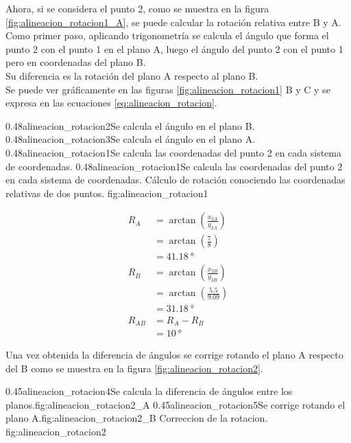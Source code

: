          Ahora, si se considera el punto 2, como se muestra en la figura \ref{fig:alineacion_rotacion1_A}, se puede calcular la rotación relativa entre B y A.\\
         Como primer paso, aplicando trigonometría se calcula el ángulo que forma el punto 2 con el punto 1 en el plano A, luego el ángulo del punto 2 con el punto 1 pero en coordenadas del plano B.\\
         Su diferencia es la rotación del plano A respecto al plano B.\\
         Se puede ver gráficamente en las figuras \ref{fig:alineacion_rotacion1} B y C y se expresa en las ecuaciones \ref{eq:alineacion_rotacion}.

\subfigtwotwo
            {0.48}{alineacion_rotacion2}{Se calcula el ángulo en el plano B.}
            {0.48}{alineacion_rotacion3}{Se calcula el ángulo en el plano A.}
            {0.48}{alineacion_rotacion1}{Se calcula las coordenadas del punto 2 en cada sistema de coordenadas.}
            {0.48}{alineacion_rotacion1}{Se calcula las coordenadas del punto 2 en cada sistema de coordenadas.}
            {Cálculo de rotación conociendo las coordenadas relativas de dos puntos.}
            {fig:alineacion_rotacion1}


         \begin{equation}
            \begin{aligned}
               R_A &= \arctan(\frac{x_{2A}}{y_{2A}}) \\
                  &= \arctan(\frac{7}{8}) \\
                  &= \SI{41.18}{\degree}\\
              R_B &= \arctan(\frac{x_{2B}}{y_{2B}})\\
                  &= \arctan(\frac{5.5}{9.09}) \\
                  &= \SI{31.18}{\degree}\\
           R_{AB} &= R_A - R_B\\
                      &= \SI{10}{\degree}
            \end{aligned}
            \label{eq:alineacion_rotacion}
         \end{equation}

         Una vez obtenida la diferencia de ángulos se corrige rotando el plano A respecto del B como se muestra en la figura \ref{fig:alineacion_rotacion2}.

\subfigab
         {0.45}{alineacion_rotacion4}{Se calcula la diferencia de ángulos entre los planos.}{fig:alineacion_rotacion2_A}
         {0.45}{alineacion_rotacion5}{Se corrige rotando el plano A.}{fig:alineacion_rotacion2_B}
         {Correccion de la rotacion.}
         {fig:alineacion_rotacion2}

